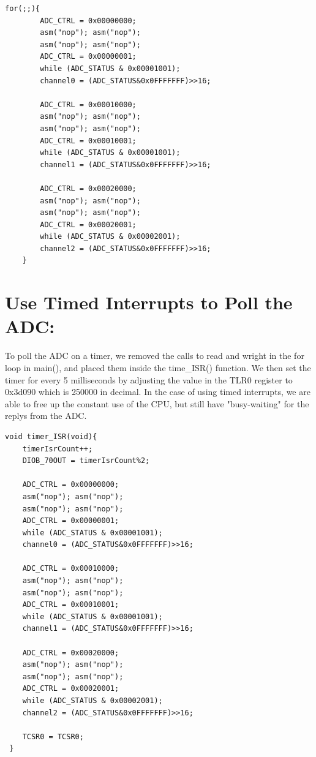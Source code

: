 \documentclass[twoside]{article}
\begin{document}
\begin{multicols}{2}
\begin{lstlisting}[frame=single]
	for(;;){
		ADC_CTRL = 0x00000000;
		asm("nop"); asm("nop"); 
		asm("nop"); asm("nop");
		ADC_CTRL = 0x00000001;
		while (ADC_STATUS & 0x00001001);
		channel0 = (ADC_STATUS&0x0FFFFFFF)>>16;

		ADC_CTRL = 0x00010000;
		asm("nop"); asm("nop"); 
		asm("nop"); asm("nop");
		ADC_CTRL = 0x00010001;
		while (ADC_STATUS & 0x00001001);
		channel1 = (ADC_STATUS&0x0FFFFFFF)>>16;

		ADC_CTRL = 0x00020000;
		asm("nop"); asm("nop");
		asm("nop"); asm("nop");
		ADC_CTRL = 0x00020001;
		while (ADC_STATUS & 0x00002001);
		channel2 = (ADC_STATUS&0x0FFFFFFF)>>16;
	}
\end{lstlisting}


\section{Use Timed Interrupts to Poll the ADC:}

\noindent To poll the ADC on a timer, we removed the calls to read and wright in the for loop in main(), and placed them inside the time\_ISR() function. We then set the timer for every 5 milliseconds by adjusting the value in the TLR0 register to  0x3d090 which is 250000 in decimal. In the case of using timed interrupts, we are able to free up the constant use of the CPU, but still have "busy-waiting" for the replys from the ADC.

\begin{lstlisting}[frame=single]
void timer_ISR(void){
	timerIsrCount++;
	DIOB_70OUT = timerIsrCount%2;
	
	ADC_CTRL = 0x00000000;
	asm("nop"); asm("nop");
	asm("nop"); asm("nop");
	ADC_CTRL = 0x00000001;
	while (ADC_STATUS & 0x00001001);
	channel0 = (ADC_STATUS&0x0FFFFFFF)>>16;

	ADC_CTRL = 0x00010000;
	asm("nop"); asm("nop");
	asm("nop"); asm("nop");
	ADC_CTRL = 0x00010001;
	while (ADC_STATUS & 0x00001001);
	channel1 = (ADC_STATUS&0x0FFFFFFF)>>16;

	ADC_CTRL = 0x00020000;
	asm("nop"); asm("nop");
	asm("nop"); asm("nop");
	ADC_CTRL = 0x00020001;
	while (ADC_STATUS & 0x00002001);
	channel2 = (ADC_STATUS&0x0FFFFFFF)>>16;
	
	TCSR0 = TCSR0;
 }
\end{lstlisting}


\end{multicols}
\end{document}
